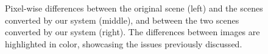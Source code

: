 \begin{figure}[t!bp]
\begin{tabular}{@{}r@{ } c@{ } c@{ } c@{ } c }
% 		
% 		
	\end{tabular}
	\caption{Pixel-wise differences between the original scene (left) and the scenes converted by our system (middle), and between the two scenes converted by our system (right). The differences between images are highlighted in color, showcasing the issues previously discussed. }
	\label{fig:diffs}
\end{figure}






